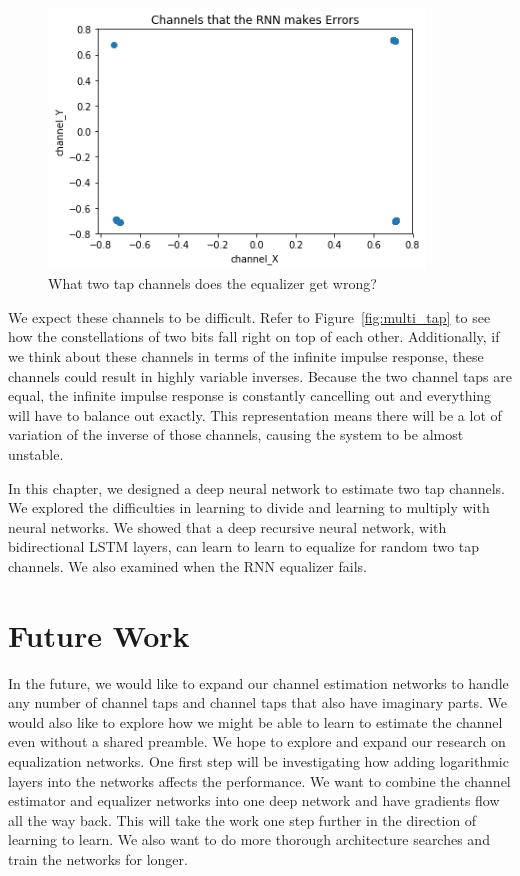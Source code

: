 \begin{figure}
\begin{center}
\includegraphics[width=100mm]{figures/equal/incorrect_channels.png}
\caption{What two tap channels does the equalizer get wrong?}
\label{fig:incorr_chan}
\end{center}
\end{figure}

We expect these channels to be difficult.  Refer to Figure~\ref{fig:multi_tap} to see how the constellations of two bits fall right on top of each other.
Additionally, if we think about these channels in terms of the infinite impulse response, these channels could result in highly variable inverses.  Because the two channel taps are equal, the infinite impulse response is constantly cancelling out and everything will have to balance out exactly.  This representation means there will be a lot of variation of the inverse of those channels, causing the system to be almost unstable.

In this chapter, we designed a deep neural network to estimate two tap channels.
We explored the difficulties in learning to divide and learning to multiply with neural networks. We showed that a deep recursive neural network, with bidirectional LSTM layers, can learn to learn to equalize for random two tap channels.  We also examined when the RNN equalizer fails. 

\section{Future Work}

In the future, we would like to expand our channel estimation networks to handle any number of channel taps and channel taps that also have imaginary parts.
We would also like to explore how we might be able to learn to estimate the channel even without a shared preamble.
We hope to explore and expand our research on equalization networks.  One first step will be investigating how adding logarithmic layers into the networks affects the performance.  
We want to combine the channel estimator and equalizer networks into one deep network and have gradients flow all the way back.  This will take the work one step further in the direction of learning to learn.
We also want to do more thorough architecture searches and train the networks for longer.